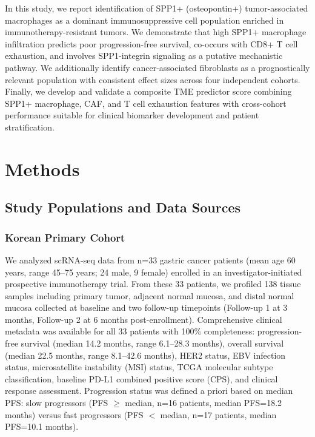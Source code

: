 \documentclass[12pt,twoside]{article}
\begin{document}
In this study, we report identification of SPP1+ (osteopontin+) tumor-associated macrophages as a dominant immunosuppressive cell population enriched in immunotherapy-resistant tumors. We demonstrate that high SPP1+ macrophage infiltration predicts poor progression-free survival, co-occurs with CD8+ T cell exhaustion, and involves SPP1-integrin signaling as a putative mechanistic pathway. We additionally identify cancer-associated fibroblasts as a prognostically relevant population with consistent effect sizes across four independent cohorts. Finally, we develop and validate a composite TME predictor score combining SPP1+ macrophage, CAF, and T cell exhaustion features with cross-cohort performance suitable for clinical biomarker development and patient stratification.


\section{Methods}

\subsection{Study Populations and Data Sources}

\subsubsection{Korean Primary Cohort}

We analyzed scRNA-seq data from n=33 gastric cancer patients (mean age 60 years, range 45--75 years; 24 male, 9 female) enrolled in an investigator-initiated prospective immunotherapy trial. From these 33 patients, we profiled 138 tissue samples including primary tumor, adjacent normal mucosa, and distal normal mucosa collected at baseline and two follow-up timepoints (Follow-up 1 at 3 months, Follow-up 2 at 6 months post-enrollment). Comprehensive clinical metadata was available for all 33 patients with 100\% completeness: progression-free survival (median 14.2 months, range 6.1--28.3 months), overall survival (median 22.5 months, range 8.1--42.6 months), HER2 status, EBV infection status, microsatellite instability (MSI) status, TCGA molecular subtype classification, baseline PD-L1 combined positive score (CPS), and clinical response assessment. Progression status was defined a priori based on median PFS: slow progressors (PFS $\geq$ median, n=16 patients, median PFS=18.2 months) versus fast progressors (PFS $<$ median, n=17 patients, median PFS=10.1 months).
\end{document}
